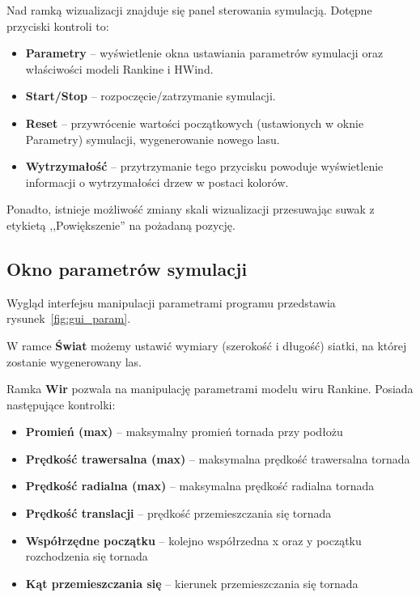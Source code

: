  Nad ramką wizualizacji znajduje się panel sterowania symulacją. Dotępne przyciski kontroli to:

\begin{itemize}
\item \textbf{Parametry} -- wyświetlenie okna ustawiania parametrów symulacji oraz właściwości modeli Rankine i HWind.
\item \textbf{Start/Stop} -- rozpoczęcie/zatrzymanie symulacji.
\item \textbf{Reset} -- przywrócenie wartości początkowych (ustawionych w oknie Parametry) symulacji, wygenerowanie nowego lasu.
\item \textbf{Wytrzymałość} -- przytrzymanie tego przycisku powoduje wyświetlenie informacji o wytrzymałości drzew w postaci kolorów.
\end{itemize}

Ponadto, istnieje możliwość zmiany skali wizualizacji przesuwając suwak z etykietą ,,Powiększenie'' na pożadaną pozycję.



\subsection{Okno parametrów symulacji}

Wygląd interfejsu manipulacji parametrami programu przedstawia rysunek~\ref{fig:gui_param}.

W ramce \textbf{Świat} możemy ustawić wymiary (szerokość i długość) siatki, na której zostanie wygenerowany las.

Ramka \textbf{Wir} pozwala na manipulację parametrami modelu wiru Rankine. Posiada następujące kontrolki:
\begin{itemize}
\item \textbf{Promień (max)} -- maksymalny promień tornada przy podłożu
\item \textbf{Prędkość trawersalna (max)} -- maksymalna prędkość trawersalna tornada
\item \textbf{Prędkość radialna (max)} -- maksymalna prędkość radialna tornada
\item \textbf{Prędkość translacji} -- prędkość przemieszczania się tornada
\item \textbf{Współrzędne początku} -- kolejno współrzedna x oraz y początku rozchodzenia się tornada
\item \textbf{Kąt przemieszczania się} -- kierunek przemieszczania się tornada
\end{itemize}

